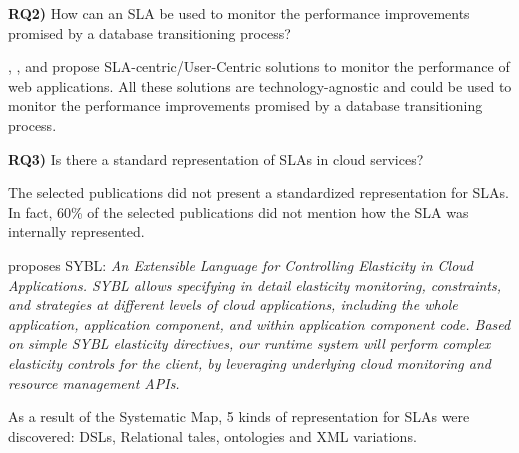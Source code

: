 \documentclass{article}
\begin{document}
\textbf{RQ2)} How can an SLA be used to monitor the performance improvements promised by a database transitioning process?

\cite{6253526}, \cite{6461875}, \cite{6511780} and \cite{Xiong:2011:APA:2038916.2038931} propose SLA-centric/User-Centric solutions to monitor the performance of web applications. All these solutions are technology-agnostic and could be used to monitor the performance improvements promised by a database transitioning process.

\textbf{RQ3)} Is there a standard representation of SLAs in cloud services? 

The selected publications did not present a standardized representation for SLAs. In fact, 60\% of the selected publications did not mention how the SLA was internally represented. 

\cite{6546068} proposes SYBL: \textit{An Extensible Language for Controlling Elasticity in Cloud Applications. SYBL allows specifying in detail elasticity monitoring, constraints, and strategies at different levels of cloud applications, including the whole application, application component, and within application component code. Based on simple SYBL elasticity directives, our runtime system will perform complex elasticity controls for the client, by leveraging underlying cloud monitoring and resource management APIs.}

As a result of the Systematic Map, 5 kinds of representation for SLAs were discovered: DSLs, Relational tales, ontologies and XML variations.


\newpage

	
\end{document}
